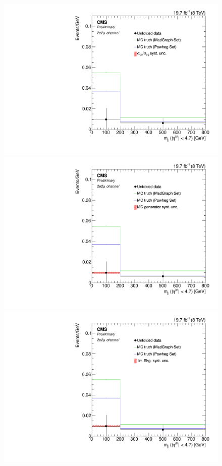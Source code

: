 \begin{figure}[hbtp]
  \begin{center}
    \includegraphics[width=0.8\cmsFigWidth]{Figures/Unfolding/Systematics/ZZTo2e2m_Mjj_qqgg_Mad_fr}     
    \includegraphics[width=0.8\cmsFigWidth]{Figures/Unfolding/Systematics/ZZTo2e2m_Mjj_MCgen_Mad_fr}     
    \includegraphics[width=0.8\cmsFigWidth]{Figures/Unfolding/Systematics/ZZTo2e2m_Mjj_IrrBkg_Mad_fr}

\end{center}
\end{figure}
